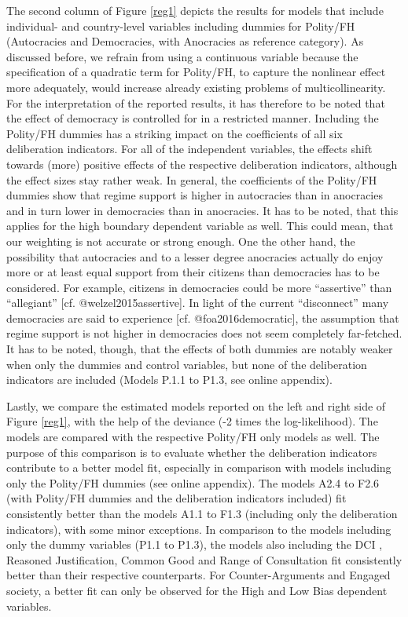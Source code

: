 \documentclass[]{article}
\begin{document}
The second column of Figure \ref{reg1} depicts the results for models
that include individual- and country-level variables including dummies
for Polity/FH (Autocracies and Democracies, with Anocracies as reference
category). As discussed before, we refrain from using a continuous
variable because the specification of a quadratic term for Polity/FH, to
capture the nonlinear effect more adequately, would increase already
existing problems of multicollinearity. For the interpretation of the
reported results, it has therefore to be noted that the effect of
democracy is controlled for in a restricted manner. Including the
Polity/FH dummies has a striking impact on the coefficients of all six
deliberation indicators. For all of the independent variables, the
effects shift towards (more) positive effects of the respective
deliberation indicators, although the effect sizes stay rather weak. In
general, the coefficients of the Polity/FH dummies show that regime
support is higher in autocracies than in anocracies and in turn lower in
democracies than in anocracies. It has to be noted, that this applies
for the high boundary dependent variable as well. This could mean, that
our weighting is not accurate or strong enough. One the other hand, the
possibility that autocracies and to a lesser degree anocracies actually
do enjoy more or at least equal support from their citizens than
democracies has to be considered. For example, citizens in democracies
could be more ``assertive'' than ``allegiant'' {[}cf.
@welzel2015assertive{]}. In light of the current ``disconnect'' many
democracies are said to experience {[}cf. @foa2016democratic{]}, the
assumption that regime support is not higher in democracies does not
seem completely far-fetched. It has to be noted, though, that the
effects of both dummies are notably weaker when only the dummies and
control variables, but none of the deliberation indicators are included
(Models P.1.1 to P1.3, see online appendix).

Lastly, we compare the estimated models reported on the left and right
side of Figure \ref{reg1}, with the help of the deviance (-2 times the
log-likelihood). The models are compared with the respective Polity/FH
only models as well. The purpose of this comparison is to evaluate
whether the deliberation indicators contribute to a better model fit,
especially in comparison with models including only the Polity/FH
dummies (see online appendix). The models A2.4 to F2.6 (with Polity/FH
dummies and the deliberation indicators included) fit consistently
better than the models A1.1 to F1.3 (including only the deliberation
indicators), with some minor exceptions. In comparison to the models
including only the dummy variables (P1.1 to P1.3), the models also
including the DCI , Reasoned Justification, Common Good and Range of
Consultation fit consistently better than their respective counterparts.
For Counter-Arguments and Engaged society, a better fit can only be
observed for the High and Low Bias dependent variables.
\end{document}
